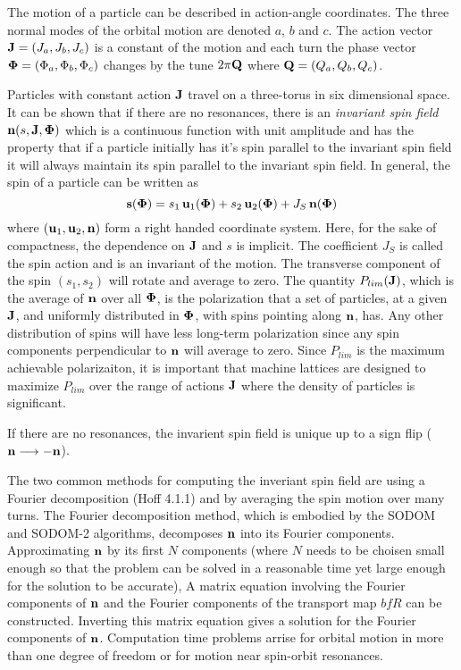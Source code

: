 \documentclass[11pt,openany]{report}
\newcommand{\Bf}[1]{{\bf #1}}
\newcommand{\bfn}{{\Bf n}}
\newcommand{\bfs}{{\Bf s}}
\newcommand{\bfu}{{\Bf u}}
\newcommand{\bfJ}{{\Bf J}}
\newcommand{\bfQ}{{\Bf Q}}
\newcommand{\bfPhi}{{\Bf \Phi}}
\newcommand{\Plim}{P_{lim}}
\newcommand{\Begineq}{\begin{equation}}
\newcommand{\Endeq}{\end{equation}}
\begin{document}
The motion of a particle can be described in action-angle coordinates. The three normal modes of the
orbital motion are denoted $a$, $b$ and $c$. The action vector $\bfJ = (J_a, J_b, J_c)$ is a
constant of the motion and each turn the phase vector $\bfPhi = (\Phi_a, \Phi_b, \Phi_c)$ changes by
the tune $2\pi\bfQ$ where $\bfQ = (Q_a, Q_b, Q_c)$.

Particles with constant action $\bfJ$ travel on a three-torus in six dimensional space. It can be
shown that if there are no resonances, there is an {\em invariant spin field} $\bfn (s,
\bfJ, \bfPhi)$ which is a continuous function with unit amplitude and has the property that if a particle
initially has it's spin parallel to the invariant spin field it will always maintain its spin
parallel to the invariant spin field. In general, the spin of a particle can be written as
\Begineq
  \bfs(\bfPhi) = s_1 \, \bfu_1(\bfPhi) + s_2 \, \bfu_2(\bfPhi) + J_S \, \bfn(\bfPhi)
\Endeq
where $(\bfu_1, \bfu_2, \bfn)$ form a right handed coordinate system. Here, for the sake of
compactness, the dependence on $\bfJ$ and $s$ is implicit. The coefficient $J_S$ is called the spin
action and is an invariant of the motion. The transverse component of the spin $(s_1, s_2)$ will
rotate and average to zero. The quantity $\Plim(\bfJ)$, which is the average of $\bfn$ over all
$\bfPhi$, is the polarization that a set of particles, at a given $\bfJ$, and uniformly distributed
in $\bfPhi$, with spins pointing along $\bfn$, has. Any other distribution of spins will have less
long-term polarization since any spin components perpendicular to $\bfn$ will average to zero. Since 
$\Plim$ is the maximum achievable polarizaiton, it is important that machine lattices are designed
to maximize $\Plim$ over the range of actions $\bfJ$ where the density of particles is significant.

If there are no resonances, the invarient spin field is unique up to a sign flip ($\bfn
\longrightarrow -\bfn$).

The two common methods for computing the inveriant spin field are using a Fourier decomposition
(Hoff 4.1.1) and by averaging the spin motion over many turns. The Fourier decomposition method,
which is embodied by the SODOM and SODOM-2 algorithms, decomposes $\bfn$ into its Fourier
components. Approximating $\bfn$ by its first $N$ components (where $N$ needs to be choisen small
enough so that the problem can be solved in a reasonable time yet large enough for the solution to
be accurate), A matrix equation involving the Fourier components of $\bfn$ and the Fourier
components of the transport map $bfR$ can be constructed. Inverting this matrix equation gives a
solution for the Fourier components of $\bfn$. Computation time problems arrise for orbital motion
in more than one degree of freedom or for motion near spin-orbit resonances.
\end{document}
